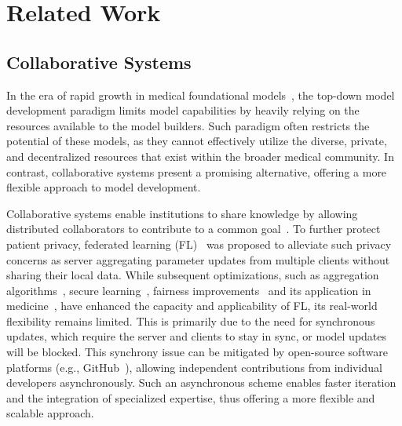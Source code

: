\section{Related Work}
\label{sec:related}
\subsection{Collaborative Systems}
In the era of rapid growth in medical foundational models~\cite{huang2023visual,wang2022medclip, zhang2024data}, the top-down model development paradigm limits model capabilities by heavily relying on the resources available to the model builders. 
Such paradigm often restricts the potential of these models, as they cannot effectively utilize the diverse, private, and decentralized resources that exist within the broader medical community.
In contrast, collaborative systems present a promising alternative, offering a more flexible approach to model development.

Collaborative systems enable institutions to share knowledge by allowing distributed collaborators to contribute to a common goal~\cite{boulemtafes2020review}. 
To further protect patient privacy, federated learning (FL)~\cite{mcmahan2017communication} was proposed to alleviate such privacy concerns as server aggregating parameter updates from multiple clients without sharing their local data. 
While subsequent optimizations, such as aggregation algorithms~\cite{mcmahan2017communication, zhao2018federated, li2020federated}, secure learning~\cite{hardy2017private, xie2021crfl}, fairness improvements~\cite{sharma2022federated, zhao2022dynamic} and its application in medicine~\cite{kumar2024privacy}, have enhanced the capacity and applicability of FL, its real-world flexibility remains limited. This is primarily due to the need for synchronous updates, which require the server and clients to stay in sync, or model updates will be blocked.
This synchrony issue can be mitigated by open-source software platforms (e.g., GitHub~\cite{github}), allowing independent contributions from individual developers asynchronously. Such an asynchronous scheme enables faster iteration and the integration of specialized expertise, thus offering a more flexible and scalable approach.

